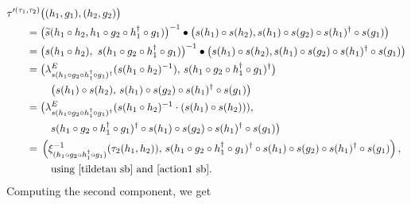\documentclass{jonasart}
\theoremstyle{plain}
\begin{document}
	\begin{align}
		\tau'^{(\tau_1,\tau_2 )} & \big((h_1,g_1 ),(h_2,g_2 )\big) \nonumber\\
		={ }&{ }\big(\widetilde{s}(h_1\circ h_2, h_1\circ g_2\circ h_1^\dagger\circ g_1 )\big)^{-1} \bullet \big(s(h_1 )\circ s(h_2 ), s(h_1 )\circ s(g_2 )\circ s(h_1 )^\dagger\circ s(g_1 )\big)\nonumber\\
		={ }&{ } \big(s(h_1\circ h_2 ),~s(h_1\circ g_2\circ h_1^\dagger\circ g_1 )\big)^{-1} \bullet \big(s(h_1 )\circ s(h_2 ), s(h_1 )\circ s(g_2 )\circ s(h_1 )^\dagger\circ s(g_1 )\big)\nonumber\\
		={ }&{ }\big(\lambda^E_{s(h_1\circ g_2\circ h_1^\dagger\circ g_1 )^\dagger}(s(h_1\circ h_2 )^{-1}), \, s(h_1\circ g_2\circ h_1^\dagger\circ g_1 )^\dagger\big) \nonumber \\
		&\quad \big(s(h_1 )\circ s(h_2 ), \, s(h_1 )\circ s(g_2 )\circ s(h_1 )^\dagger\circ s(g_1 )\big)\nonumber\\
		={ }&{ }\big(\lambda^E_{s(h_1\circ g_2\circ h_1^\dagger\circ g_1 )^\dagger} (s(h_1\circ h_2 )^{-1}\cdot (s(h_1 )\circ s(h_2 ))), \nonumber\\
		&\quad s(h_1\circ g_2\circ h_1^\dagger\circ g_1 )^\dagger\circ s(h_1 )\circ s(g_2 )\circ s(h_1 )^\dagger\circ s(g_1 ) \big)\nonumber\\
		={ }&{ }\left(\xi^{-1}_{(h_1\circ g_2\circ h_1^\dagger\circ g_1 )}(\tau_2 (h_1,h_2 )), \, s(h_1\circ g_2\circ h_1^\dagger\circ g_1 )^\dagger\circ s(h_1 )\circ s(g_2 )\circ s(h_1 )^\dagger\circ s(g_1 )\right), \label{tilde tau}\nonumber\\
		&\quad\text{using \eqref{tildetau sb} and \eqref{action1 sb}.}
	\end{align}
	Computing the second component, we get
\end{document}
